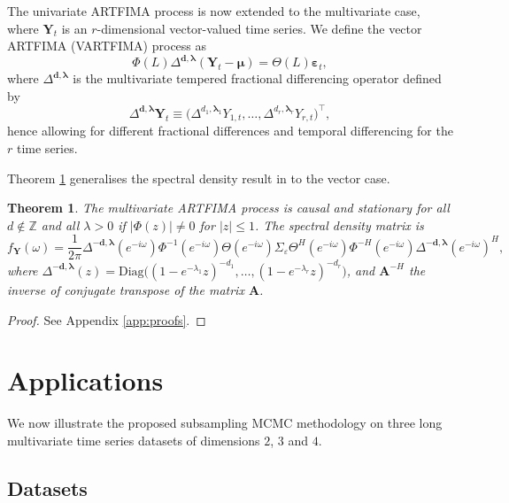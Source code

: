 \documentclass[11pt,english,oneside]{amsart}
\numberwithin{equation}{section}
\newtheorem{theorem}{Theorem} %
\theoremstyle{plain}
\numberwithin{equation}{section}
\renewcommand{\v}[1]{\boldsymbol{#1}}
\begin{document}
The univariate ARTFIMA process is now extended to the multivariate case, where $\mathbf{Y}_{t}$ is an $r$-dimensional vector-valued time series. We define the vector ARTFIMA (VARTFIMA) process as
\begin{equation}\label{eq:vartfima}
    \Phi(L)\Delta^{\mathbf{d},\v \lambda}(\mathbf{Y}_{t}-\v \mu)=\Theta(L) \v \varepsilon_{t},
\end{equation} 
where $\Delta^{\mathbf{d},\v \lambda}$ is the multivariate tempered fractional differencing operator defined by
\begin{equation}
    \Delta^{\mathbf{d},\v \lambda}\mathbf{Y}_{t} \equiv
    \Big(\Delta^{d_1,\v \lambda_1} Y_{1,t},\ldots, \Delta^{d_r,\v \lambda_r} Y_{r,t} \Big)^\top,
\end{equation}
hence allowing for different fractional differences and temporal differencing for the $r$ time series.

Theorem \ref{thm:stationary} generalises the spectral density result in \cite{Sabzikar2019} to the vector case.
\begin{theorem}\label{thm:stationary}
    The multivariate ARTFIMA process is causal and stationary for all $d\notin \mathbb{Z}$ and all $\lambda>0$ if $|\Phi(z)|\neq 0$ for $|z| \leq 1$. The spectral density matrix is 
    \begin{equation*}
        f_{\mathbf{Y}}(\omega) = \frac{1}{2\pi} \Delta^{\mathbf{-d},\v \lambda}(e^{-i\omega}) \Phi^{-1}(e^{-i\omega})\Theta(e^{-i\omega}) \Sigma_{\varepsilon} \Theta^H(e^{-i\omega})  \Phi^{-H}(e^{-i\omega})  \Delta^{\mathbf{-d},\v \lambda}(e^{-i\omega})^H,
    \end{equation*}
    where $\Delta^{\mathbf{-d},\v \lambda}(z) = \mathrm{Diag}\big((1-e^{-\lambda_1}z)^{-d_1},\ldots,(1-e^{-\lambda_r }z)^{-d_r}\big)$, and $\v A^{-H}$ the inverse of conjugate transpose of the matrix $\v A$.
\end{theorem}
\begin{proof}
    See Appendix \ref{app:proofs}. 
\end{proof}

\section{Applications}\label{sec:Applications}
We now illustrate the proposed subsampling MCMC methodology on three long multivariate time series datasets of dimensions $2$, $3$ and $4$. 

\subsection{Datasets}\label{subsec:Data}
\end{document}
